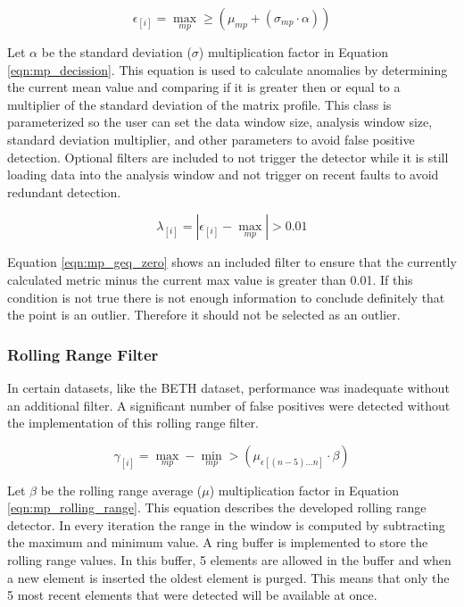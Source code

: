 \begin{equation}
    \label{eqn:mp_decission}
    \epsilon_{[i]} = \max_{mp} \geq \left(\mu_{mp} + \left(\sigma_{mp} \cdot \alpha\right)\right)
\end{equation}


Let $ \alpha$ be the standard deviation ($\sigma$) multiplication factor in Equation \ref{eqn:mp_decission}. This equation is used to calculate anomalies by determining the current mean value and comparing if it is greater then or equal to a multiplier of the standard deviation of the matrix profile. This class is parameterized so the user can set the data window size, analysis window size, standard deviation multiplier, and other parameters to avoid false positive detection. Optional filters are included to not trigger the detector while it is still loading data into the analysis window and not trigger on recent faults to avoid redundant detection. 

\begin{equation}
    \label{eqn:mp_geq_zero}
    \lambda_{[i]} = \left| \epsilon_{[i]} - \max_{mp} \right| > 0.01
\end{equation}

Equation \ref{eqn:mp_geq_zero} shows an included filter to ensure that the currently calculated metric minus the current max value is greater than 0.01. If this condition is not true there is not enough information to conclude definitely that the point is an outlier. Therefore it should not be selected as an outlier.

\subsubsection{Rolling Range Filter}

In certain datasets, like the BETH dataset, performance was inadequate without an additional filter. A significant number of false positives were detected without the implementation of this rolling range filter.

\begin{equation}
    \label{eqn:mp_rolling_range}
    \gamma_{[i]} = \max_{mp} - \min_{mp} > \left(\mu_{\epsilon[(n-5)...n]} \cdot \beta \right)
\end{equation}

Let $ \beta$ be the rolling range average ($\mu$) multiplication factor in Equation \ref{eqn:mp_rolling_range}. This equation describes the developed rolling range detector. In every iteration the range in the window is computed by subtracting the maximum and minimum value. A ring buffer is implemented to store the rolling range values. In this buffer, 5 elements are allowed in the buffer and when a new element is inserted the oldest element is purged. This means that only the 5 most recent elements that were detected will be available at once.

